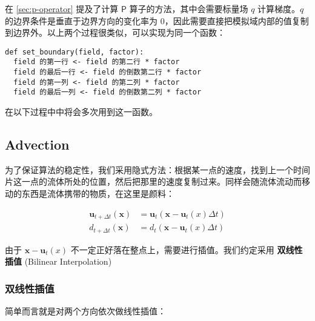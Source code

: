\documentclass{ctexart}
\begin{document}
在 \ref{sec:p-operator} 提及了计算 $\mathsf{P}$ 算子的方法，其中会需要标量场 $q$ 计算梯度。$q$ 的边界条件是垂直于边界方向的变化率为 0，因此需要直接把模拟域内部的值复制到边界外。以上两个过程很类似，可以实现为同一个函数：

\begin{verbatim}
def set_boundary(field, factor):
  field 的第一行 <- field 的第二行 * factor
  field 的最后一行 <- field 的倒数第二行 * factor
  field 的第一列 <- field 的第二列 * factor
  field 的最后一列 <- field 的倒数第二列 * factor
\end{verbatim}

在以下过程中中将会多次用到这一函数。

\subsection{Advection}

为了保证算法的稳定性，我们采用隐式方法：根据某一点的速度，找到上一个时间片这一点的流体所处的位置，然后把那里的速度复制过来。同样会随流体流动而移动的东西是流体携带的物质，在这里是颜料：

\begin{equation}
\begin{split}
  \mathbf{u}_{t + \Delta t}(\mathbf{x}) &= \mathbf{u}_t(\mathbf{x} - \mathbf{u}_t(x) \Delta t) \\
  d_{t + \Delta t}(\mathbf{x}) &= d_t(\mathbf{x} - \mathbf{u}_t(x) \Delta t)
\end{split}
\end{equation}

由于 $\mathbf{x} - \mathbf{u}_t(x)$ 不一定正好落在整点上，需要进行插值。我们约定采用 \textbf{双线性插值} (Bilinear Interpolation)

\subsubsection{双线性插值}

简单而言就是对两个方向依次做线性插值：

\begin{figure}[!h]
  \centering

\end{figure}
\end{document}
